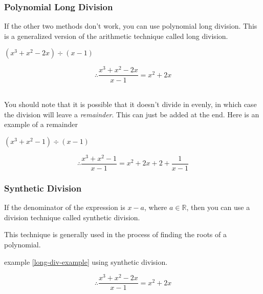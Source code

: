 \documentclass[english,seminar]{lecture}
\begin{document}
\subsubsection{Polynomial Long Division}


If the other two methods don't work, you can use polynomial long division.
This is a generalized version of the arithmetic technique called long division.

\begin{example}[Simplify]\label{long-div-example}
	$(x^3 + x^2 - 2x) \div (x - 1)$


	\begin{center}
	\end{center}
	
	$$
	\therefore \frac{x^3 + x^2 - 2x}{x - 1} = x^2 + 2x
	$$
\end{example}
\\
You should note that it is possible that it doesn't divide in evenly,
in which case the division will leave a \emph{remainder}.
This can just be added at the end. Here is an example of a remainder

\begin{example}[Simplify]
	$(x^3 + x^2 - 1) \div (x - 1)$


	\begin{center}
	\end{center}

	$$
	\therefore \frac{x^3 + x^2 - 1}{x - 1} = x^2 + 2x + 2 + \frac{1}{x - 1}
	$$
	
\end{example}

\subsubsection{Synthetic Division}

If the denominator of the expression is $x - a$, where $a \in \mathbb{R}$, then you can use a 
division technique called synthetic division.

This technique is generally used in the process of finding the roots of a polynomial.

\begin{example}[Complete]
example \ref{long-div-example} using synthetic division.

\begin{center}
\end{center}

$$
\therefore \frac{x^3 + x^2 - 2x}{x - 1} = x^2 + 2x
$$

\end{example}
\end{document}
